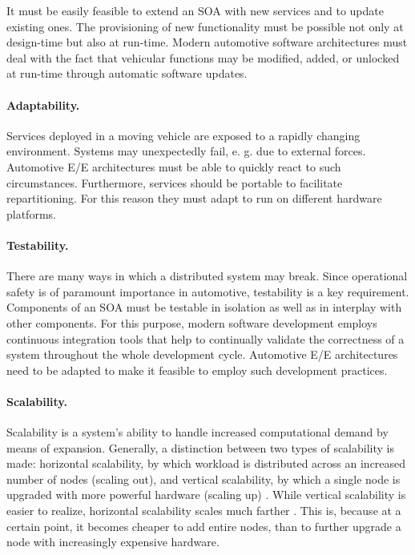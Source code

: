 It must be easily feasible to extend an SOA with new services and to update existing ones. The provisioning of new functionality must be possible not only at design-time but also at run-time. Modern automotive software architectures must deal with the fact that vehicular functions may be modified, added, or unlocked at run-time through automatic software updates.

\paragraph{Adaptability.}
Services deployed in a moving vehicle are exposed to a rapidly changing environment. Systems may unexpectedly fail, e. g. due to external forces. Automotive E/E architectures must be able to quickly react to such circumstances. Furthermore, services should be portable to facilitate repartitioning. For this reason they must adapt to run on different hardware platforms.

\paragraph{Testability.}
There are many ways in which a distributed system may break. Since operational safety is of paramount importance in automotive, testability is a key requirement. Components of an SOA must be testable in isolation as well as in interplay with other components. For this purpose, modern software development employs continuous integration tools that help to continually validate the correctness of a system throughout the whole development cycle. Automotive E/E architectures need to be adapted to make it feasible to employ such development practices.


\paragraph{Scalability.}
Scalability  is a system's ability to handle increased computational demand by means of expansion. Generally, a distinction between two types of scalability is made: horizontal scalability, by which workload is distributed across an increased number of nodes (scaling out), and vertical scalability, by which a single node is upgraded with more powerful hardware (scaling up) \cite{tanenbaum2017distributed}. While vertical scalability is easier to realize, horizontal scalability scales much farther . This is, because at a certain point, it becomes cheaper to add entire nodes, than to further upgrade a node with increasingly expensive hardware.


